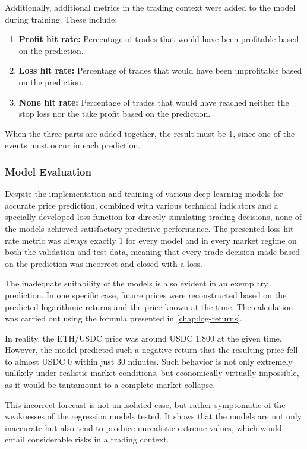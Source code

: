Additionally, additional metrics in the trading context were added to the model during training.
These include:

\begin{enumerate}
    \item \textbf{Profit hit rate:} Percentage of trades that would have been profitable based on the prediction.
    \item \textbf{Loss hit rate:} Percentage of trades that would have been unprofitable based on the prediction.
    \item \textbf{None hit rate:} Percentage of trades that would have reached neither the stop loss nor the take profit based on the prediction.
\end{enumerate}

\noindent
When the three parts are added together, the result must be 1, since one of the events must occur in each prediction.

\subsubsection{Model Evaluation}
\label{chap:regression-models-evaluation}

Despite the implementation and training of various deep learning models for accurate price prediction, combined with various technical indicators and a specially developed loss function for directly simulating trading decisions, none of the models achieved satisfactory predictive performance.
The presented loss hit-rate metric was always exactly 1 for every model and in every market regime on both the validation and test data, meaning that every trade decision made based on the prediction was incorrect and closed with a loss.

The inadequate suitability of the models is also evident in an exemplary prediction.
In one specific case, future prices were reconstructed based on the predicted logarithmic returns and the price known at the time.
The calculation was carried out using the formula presented in \autoref{chap:log-returns}.

In reality, the ETH/USDC price was around USDC 1,800 at the given time.
However, the model predicted such a negative return that the resulting price fell to almost USDC 0 within just 30 minutes.
Such behavior is not only extremely unlikely under realistic market conditions, but economically virtually impossible, as it would be tantamount to a complete market collapse.

This incorrect forecast is not an isolated case, but rather symptomatic of the weaknesses of the regression models tested.
It shows that the models are not only inaccurate but also tend to produce unrealistic extreme values, which would entail considerable risks in a trading context.

